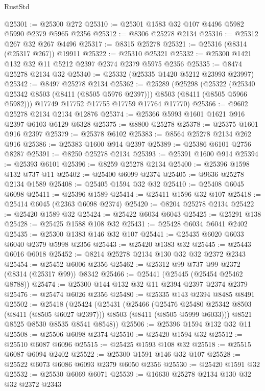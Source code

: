 \begin{lexlean}{RustStd}
\begin{coremodule}
@25301 := @25300 @272
@25310 := @25301 @1583 @32 @107 @4496 @5982 @5990 @2379 @5965 @2356
@25312 := @8306 @25278 @2134
@25316 := @25312 @267 @32 @267 @4496
@25317 := @8315 @25278
@25321 := @25316 (@8314 (@25317 @267)) @19911
@25322 := @25310 @25321
@25332 := @25300 @1421 @132 @32 @11 @5212 @2397 @2374 @2379 @5975 @2356
@25335 := @8474 @25278 @2134 @32
@25340 := @25332 (@25335 @1420 @5212 @23993 @23997)
@25342 := @8497 @25278 @2134
@25362 := @25289
    (@25298
      (@25322 (@25340 @25342 @8503 (@8411 (@8505 @5976 @2397))) @8503 (@8411 (@8505 @5966 @5982)))
      @17749
      @17752
      @17755
      @17759
      @17764
      @17770)
@25366 := @9602 @25278 @2134 @2134 @12876
@25374 := @25366 @5993 @1601 @1621 @916 @2397 @6103 @6129 @6328
@25375 := @8800 @25278
@25378 := @25375 @1601 @916 @2397
@25379 := @25378 @6102
@25383 := @8564 @25278 @2134 @262 @916
@25386 := @25383 @1600 @914 @2397
@25389 := @25386 @6101 @2756 @8287
@25391 := @8250 @25278 @2134
@25393 := @25391 @1600 @914
@25394 := @25393 @6101
@25396 := @8259 @25278 @2134
@25400 := @25396 @1598 @132 @737 @11
@25402 := @25400 @6099 @2374
@25405 := @9636 @25278 @2134 @1589
@25408 := @25405 @1594 @32 @32
@25410 := @25408 @6045 @6098
@25411 := @25396 @1589
@25414 := @25411 @1596 @32 @107
@25418 := @25414 @6045 (@2363 @6098 @2374)
@25420 := @8204 @25278 @2134
@25422 := @25420 @1589 @32
@25424 := @25422 @6034 @6043
@25425 := @25291 @138
@25428 := @25425 @1588 @108 @32
@25431 := @25428 @6034 @6041 @2402
@25435 := @25300 @1383 @146 @32 @107
@25441 := @25435 @6020 @6033 @6040 @2379 @5998 @2356
@25443 := @25420 @1383 @32
@25445 := @25443 @6016 @6018
@25452 := @8214 @25278 @2134 @130 @32 @32 @2372 @2343
@25454 := @25452 @6006 @2356
@25462 := @25312 @99 @737 @99 @2372 (@8314 (@25317 @99)) @8342
@25466 := @25441 (@25445 (@25454 @25462 @8788))
@25474 := @25300 @144 @132 @32 @11 @2394 @2397 @2374 @2379
@25476 := @25474 @6026 @2356
@25480 := @25335 @143 @2394 @8485 @8491
@25502 := @25418
    (@25424
      (@25431
        (@25466
          (@25476 @25480 @25342 @8503 (@8411 (@8505 @6027 @2397)))
          @8503
          (@8411 (@8505 @5999 @6033)))
        @8521
        @8525
        @8530
        @8535
        @8541
        @8548))
@25506 := @25396 @1594 @132 @32 @11
@25508 := @25506 @6098 @2374
@25510 := @25420 @1594 @32
@25512 := @25510 @6087 @6096
@25515 := @25425 @1593 @108 @32
@25518 := @25515 @6087 @6094 @2402
@25522 := @25300 @1591 @146 @32 @107
@25528 := @25522 @6073 @6086 @6093 @2379 @6050 @2356
@25530 := @25420 @1591 @32
@25532 := @25530 @6069 @6071
@25539 := @16630 @25278 @2134 @130 @32 @32 @2372 @2343

\end{coremodule}
\end{lexlean}
